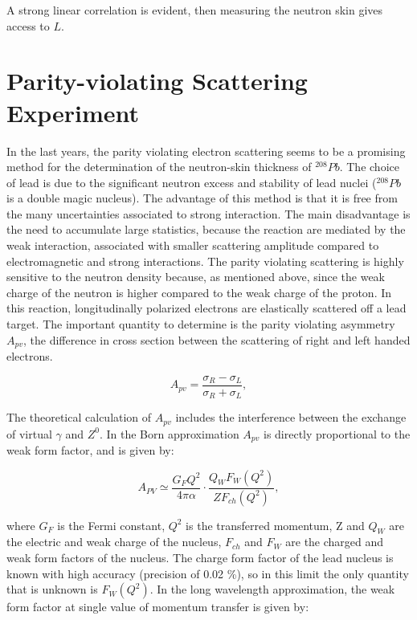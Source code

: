 A strong linear correlation is evident, then measuring the neutron skin gives access to $L$. 
  
\section{Parity-violating Scattering Experiment}

In the last years, the parity violating electron scattering seems to be a promising method for the determination of the neutron-skin thickness of $^{208}Pb$. The choice of lead is due to the significant neutron excess and stability of lead nuclei ($^{208}Pb$ is a double magic nucleus). The advantage of this method is that it is free from the many uncertainties associated to strong interaction. The main disadvantage is the need to accumulate large statistics, because the reaction are mediated by the weak interaction, associated with smaller scattering amplitude compared to electromagnetic and strong interactions. 
The parity violating scattering is highly sensitive to the neutron density because, as mentioned above, since the weak charge of the neutron is higher compared to the weak charge of the proton.
In this reaction, longitudinally polarized electrons are elastically scattered off a lead target. The important quantity to determine is the parity violating asymmetry $A_{pv}$, the difference in cross section between the scattering of right and left handed electrons. 

\begin{equation}
A_{pv} = \dfrac{\sigma_{R} - \sigma_{L}}{\sigma_{R} + \sigma_{L}} ,
\end{equation} 

The theoretical calculation of $A_{pv}$ includes the interference between the exchange of virtual $\gamma$ and $Z^{0}$. In the Born approximation $A_{pv}$ is directly proportional to the weak form factor, and is given by:

\begin{equation} \label{eq:BornLimit}
A_{PV} \simeq \dfrac{G_{F} Q^{2}}{4 \pi \alpha} \cdot \dfrac{Q_{W} F_{W}(Q^{2})}{Z F_{ch}(Q^{2})} ,
\end{equation} 

where $G_{F}$ is the Fermi constant, $Q^{2}$ is the transferred momentum, Z and $Q_{W}$ are the electric and weak charge of the nucleus, $F_{ch}$ and $F_{W}$ are the charged and weak form factors of the nucleus. The charge form factor of the lead nucleus is known with high accuracy (precision of 0.02 \%), so in this limit the only quantity that is unknown is $F_{W}(Q^{2})$. In the long wavelength approximation, the weak form factor at single value of momentum transfer is given by:

